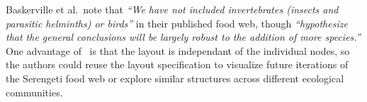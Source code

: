 Baskerville et al.\ note that \emph{``We have not included invertebrates
  (insects and parasitic helminths) or birds''} in their published food
web, though \emph{``hypothesize that the general conclusions will be
  largely robust to the addition of more species.''} One advantage of
\projectname~is that the layout is independant of the individual nodes, so
the authors could reuse the layout specification to visualize future iterations
of the Serengeti food web or explore similar structures across different
ecological communities.
